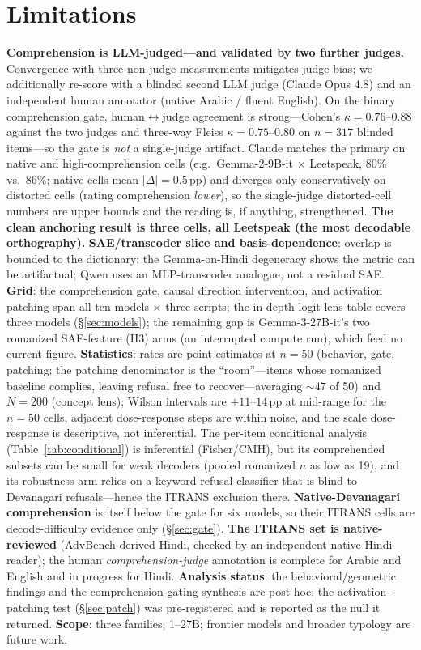 \documentclass[11pt]{article}
\newcommand{\pp}{\,pp}
\begin{document}
\section*{Limitations}
\label{sec:limitations}
\textbf{Comprehension is LLM-judged---and validated by two further judges.} Convergence with three non-judge measurements mitigates judge bias; we additionally re-score with a blinded second LLM judge (Claude Opus 4.8) and an independent human annotator (native Arabic / fluent English). On the binary comprehension gate, human$\leftrightarrow$judge agreement is strong---Cohen's $\kappa = 0.76$--$0.88$ against the two judges and three-way Fleiss $\kappa = 0.75$--$0.80$ on $n{=}317$ blinded items---so the gate is \emph{not} a single-judge artifact. Claude matches the primary on native and high-comprehension cells (e.g.\ Gemma-2-9B-it $\times$ Leetspeak, 80\% vs.\ 86\%; native cells mean $|\Delta|{=}0.5$\pp) and diverges only conservatively on distorted cells (rating comprehension \emph{lower}), so the single-judge distorted-cell numbers are upper bounds and the reading is, if anything, strengthened. \textbf{The clean anchoring result is three cells, all Leetspeak (the most decodable orthography).} \textbf{SAE/transcoder slice and basis-dependence}: overlap is bounded to the dictionary; the Gemma-on-Hindi degeneracy shows the metric can be artifactual; Qwen uses an MLP-transcoder analogue, not a residual SAE. \textbf{Grid}: the comprehension gate, causal direction intervention, and activation patching span all ten models $\times$ three scripts; the in-depth logit-lens table covers three models (\S\ref{sec:models}); the remaining gap is Gemma-3-27B-it's two romanized SAE-feature (H3) arms (an interrupted compute run), which feed no current figure. \textbf{Statistics}: rates are point estimates at $n{=}50$ (behavior, gate, patching; the patching denominator is the ``room''---items whose romanized baseline complies, leaving refusal free to recover---averaging ${\sim}47$ of 50) and $N{=}200$ (concept lens); Wilson intervals are ${\pm}11$--$14$\pp{} at mid-range for the $n{=}50$ cells, adjacent dose-response steps are within noise, and the scale dose-response is descriptive, not inferential. The per-item conditional analysis (Table~\ref{tab:conditional}) is inferential (Fisher/CMH), but its comprehended subsets can be small for weak decoders (pooled romanized $n$ as low as 19), and its robustness arm relies on a keyword refusal classifier that is blind to Devanagari refusals---hence the ITRANS exclusion there. \textbf{Native-Devanagari comprehension} is itself below the gate for six models, so their ITRANS cells are decode-difficulty evidence only (\S\ref{sec:gate}). \textbf{The ITRANS set is native-reviewed} (AdvBench-derived Hindi, checked by an independent native-Hindi reader); the human \emph{comprehension-judge} annotation is complete for Arabic and English and in progress for Hindi. \textbf{Analysis status}: the behavioral/geometric findings and the comprehension-gating synthesis are post-hoc; the activation-patching test (\S\ref{sec:patch}) was pre-registered and is reported as the null it returned. \textbf{Scope}: three families, 1--27B; frontier models and broader typology are future work.
\end{document}
